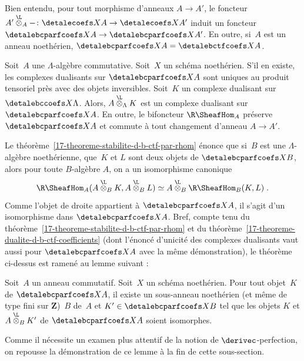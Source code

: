 \documentclass[10pt]{../fichiers-configuration-latex/smfart}
\begin{document}
Bien entendu, pour tout morphisme d'anneaux $A\to A'$, le foncteur
$A'\overset{\L}\otimes_A -\colon \detalecoefs X A\to \detalecoefs X {A'}$
induit un foncteur $\detalebcparfcoefs X A\to \detalebcparfcoefs X {A'}$.
En outre, si $A$ est un anneau noethérien,
$\detalebcparfcoefs X A=\detalebctfcoefs X A$.

\begin{theoreme2}\label{17-theoreme-dualite-d-b-c-parf-coefficients}
Soit $A$ une $\Lambda$-algèbre commutative. Soit $X$ un schéma
noethérien. S'il en existe, les
complexes dualisants sur $\detalebcparfcoefs X A$ sont uniques au produit
tensoriel près avec des objets inversibles.
Soit $K$ un complexe dualisant sur $\detalebccoefs X \Lambda$.
Alors, $A\overset{\L}\otimes_{\Lambda} K$ est un complexe dualisant
sur $\detalebcparfcoefs X A$.
En outre, le bifoncteur $\R\SheafHom_A$ préserve $\detalebcparfcoefs X A$
et commute à tout changement d'anneau $A\to A'$.
\end{theoreme2}

Le théorème~\ref{17-theoreme-stabilite-d-b-ctf-par-rhom} énonce
que si $B$ est une $\Lambda$-algèbre noethérienne, que $K$ et $L$
sont deux objets de $\detalebcparfcoefs X B$, alors pour toute $B$-algèbre
$A$, on a un isomorphisme canonique
\[\R\SheafHom_A(A\overset{\L}\otimes_B K,
A\overset{\L}\otimes_B
L)\simeq A\overset{\L}\otimes_B 
\R\SheafHom_B(K,L)\;\text{.}\]
Comme l'objet de droite appartient à $\detalebcparfcoefs X A$, il s'agit d'un
isomorphisme dans $\detalebcparfcoefs X A$.
Bref, compte tenu du
théorème~\ref{17-theoreme-stabilite-d-b-ctf-par-rhom} et
du théorème~\ref{17-theoreme-dualite-d-b-ctf-coefficients} (dont l'énoncé
d'unicité des complexes dualisants vaut aussi pour $\detalebcparfcoefs X A$ avec
la même démonstration), le théorème ci-dessus est ramené au lemme suivant :

\begin{lemme2}\label{17-lemme-approximation-noetherienne}
Soit $A$ un anneau commutatif.
Soit $X$ un schéma noethérien. Pour tout objet $K$ de
$\detalebcparfcoefs
X A$, il existe un sous-anneau noethérien (et même de type fini sur
$\mathbf{Z}$) $B$ de $A$ et $K'\in \detalebcparfcoefs X B$ tel que les objets
$K$ et $A\overset{\L}\otimes_B K'$ de $\detalebcparfcoefs X A$ soient
isomorphes.
\end{lemme2}

Comme il nécessite un examen plus attentif de la notion de
$\derivec$-perfection, on repousse la démonstration de ce lemme à la fin de
cette sous-section.
\end{document}
